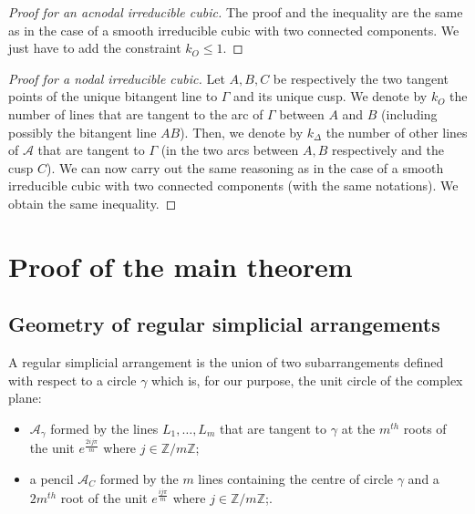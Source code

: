 \documentclass[a4paper,11pt,reqno]{amsart}
\theoremstyle{definition}
\theoremstyle{remark}
\theoremstyle{definition}
\theoremstyle{definition}
\theoremstyle{definition}
\numberwithin{equation}{section}
\begin{document}
\begin{proof}[Proof for an acnodal irreducible cubic]
The proof and the inequality are the same as in the case of a smooth irreducible cubic with two connected components. We just have to add the constraint $k_{O} \leq 1$.
\end{proof}


\begin{proof}[Proof for a nodal irreducible cubic]
Let $A,B,C$ be respectively the two tangent points of the unique bitangent line to $\Gamma$ and its unique cusp. We denote by $k_{O}$ the number of lines that are tangent to the arc of $\Gamma$ between $A$ and $B$ (including possibly the bitangent line $AB$). Then, we denote by $k_{\Delta}$ the number of other lines of $\mathcal{A}$ that are tangent to $\Gamma$ (in the two arcs between $A,B$ respectively and the cusp $C$). We can now carry out the same reasoning as in the case of a smooth irreducible cubic with two connected components (with the same notations). We obtain the same inequality.
\end{proof}

\section{Proof of the main theorem}\label{sec:rigidity}

\subsection{Geometry of regular simplicial arrangements}\label{sub:trigo}

A regular simplicial arrangement is the union of two subarrangements defined with respect to a circle $\gamma$ which is, for our purpose, the unit circle of the complex plane:
\begin{itemize}
    \item $\mathcal{A}_{\gamma}$ formed by the lines $L_{1},\dots,L_{m}$ that are tangent to $\gamma$ at the $m^{th}$ roots of the unit $e^{\frac{2ij\pi}{m}}$ where $j \in \mathbb{Z}/m\mathbb{Z}$;
    \item a pencil $\mathcal{A}_{C}$ formed by the $m$ lines containing the centre of circle $\gamma$ and a $2m^{th}$ root of the unit $e^{\frac{ij\pi}{m}}$ where $j \in \mathbb{Z}/m\mathbb{Z}$;. 
\end{itemize}
\end{document}
